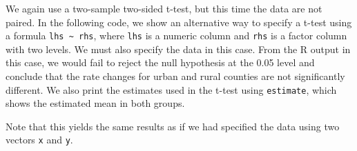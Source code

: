 \documentclass[
  letterpaper,
]{latex/krantz}
\makeatletter
\newenvironment{Shaded}{\begin{snugshade}}{\end{snugshade}}
\newcommand{\AttributeTok}[1]{\textcolor[rgb]{0.40,0.45,0.13}{#1}}
\newcommand{\CommentTok}[1]{\textcolor[rgb]{0.37,0.37,0.37}{#1}}
\newcommand{\FunctionTok}[1]{\textcolor[rgb]{0.28,0.35,0.67}{#1}}
\newcommand{\NormalTok}[1]{\textcolor[rgb]{0.00,0.23,0.31}{#1}}
\newcommand{\OtherTok}[1]{\textcolor[rgb]{0.00,0.23,0.31}{#1}}
\newcommand{\SpecialCharTok}[1]{\textcolor[rgb]{0.37,0.37,0.37}{#1}}
\newenvironment{kframe}{%
\medskip{}
\setlength{\fboxsep}{.8em}
 \def\at@end@of@kframe{}%
 \ifinner\ifhmode%
  \def\at@end@of@kframe{\end{minipage}}%
  \begin{minipage}{\columnwidth}%
 \fi\fi%
 \def\FrameCommand##1{\hskip\@totalleftmargin \hskip-\fboxsep
 \colorbox{shadecolor}{##1}\hskip-\fboxsep
     \hskip-\linewidth \hskip-\@totalleftmargin \hskip\columnwidth}%
 \MakeFramed {\advance\hsize-\width
   \@totalleftmargin\z@ \linewidth\hsize
   \@setminipage}}%
 {\par\unskip\endMakeFramed%
 \at@end@of@kframe}
\renewenvironment{Shaded}{\begin{kframe}}{\end{kframe}}
\makeatother
\begin{document}
We again use a two-sample two-sided t-test, but this time the data are
not paired. In the following code, we show an alternative way to specify
a t-test using a formula \texttt{lhs\ \textasciitilde{}\ rhs}, where
\texttt{lhs} is a numeric column and \texttt{rhs} is a factor column
with two levels. We must also specify the data in this case. From the R
output in this case, we would fail to reject the null hypothesis at the
0.05 level and conclude that the rate changes for urban and rural
counties are not significantly different. We also print the estimates
used in the t-test using \texttt{estimate}, which shows the estimated
mean in both groups.

\begin{Shaded}
\end{Shaded}

Note that this yields the same results as if we had specified the data
using two vectors \texttt{x} and \texttt{y}.
\end{document}
